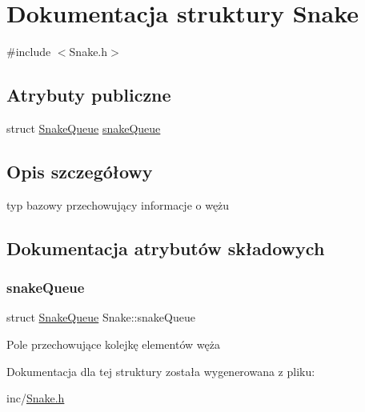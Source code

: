 \hypertarget{struct_snake}{}\section{Dokumentacja struktury Snake}
\label{struct_snake}


{\ttfamily \#include $<$Snake.\+h$>$}

\subsection*{Atrybuty publiczne}
\begin{DoxyCompactItemize}
\item 
struct \mbox{\hyperlink{struct_snake_queue}{Snake\+Queue}} \mbox{\hyperlink{struct_snake_a922463cae715aed7c5276b753ffa3ba7}{snake\+Queue}}
\end{DoxyCompactItemize}


\subsection{Opis szczegółowy}
typ bazowy przechowujący informacje o wężu 

\subsection{Dokumentacja atrybutów składowych}
\mbox{\label{struct_snake_a922463cae715aed7c5276b753ffa3ba7}} 
\subsubsection{\texorpdfstring{snake\+Queue}{snakeQueue}}
{\footnotesize\ttfamily struct \mbox{\hyperlink{struct_snake_queue}{Snake\+Queue}} Snake\+::snake\+Queue}

Pole przechowujące kolejkę elementów węża 

Dokumentacja dla tej struktury została wygenerowana z pliku\+:\begin{DoxyCompactItemize}
\item 
inc/\mbox{\hyperlink{_snake_8h}{Snake.\+h}}\end{DoxyCompactItemize}
